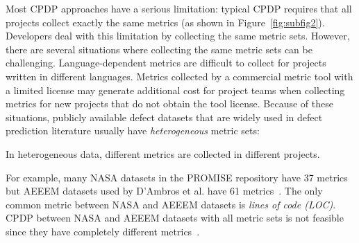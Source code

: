 Most CPDP approaches have a serious limitation:
typical CPDP requires that all projects collect exactly the same metrics (as shown in Figure~\ref{fig:subfig2}).
Developers deal with this limitation by collecting the same metric sets.
However, there are several situations where collecting the same metric sets can be challenging. Language-dependent metrics are difficult to collect for projects written in different languages.
Metrics collected by a commercial metric tool with a limited license may generate additional cost for project teams when collecting metrics for new projects that do not obtain the tool license. Because of these situations,
publicly available defect
datasets that are widely used in defect prediction literature usually have
{\em heterogeneous} metric sets:
\squishlist
\item
In heterogeneous data, different metrics are collected in different projects.
\item
For example, many NASA datasets in the PROMISE repository have 37 metrics but
AEEEM datasets used by D'Ambros et al. have 61
metrics~\cite{DAmbros12,promise12}.
The only common metric between NASA and AEEEM datasets is {\em lines of
code (LOC)}.
CPDP between NASA and AEEEM
datasets with all metric sets is not feasible since they have
completely different metrics~\cite{Turhan09}.
\squishend

